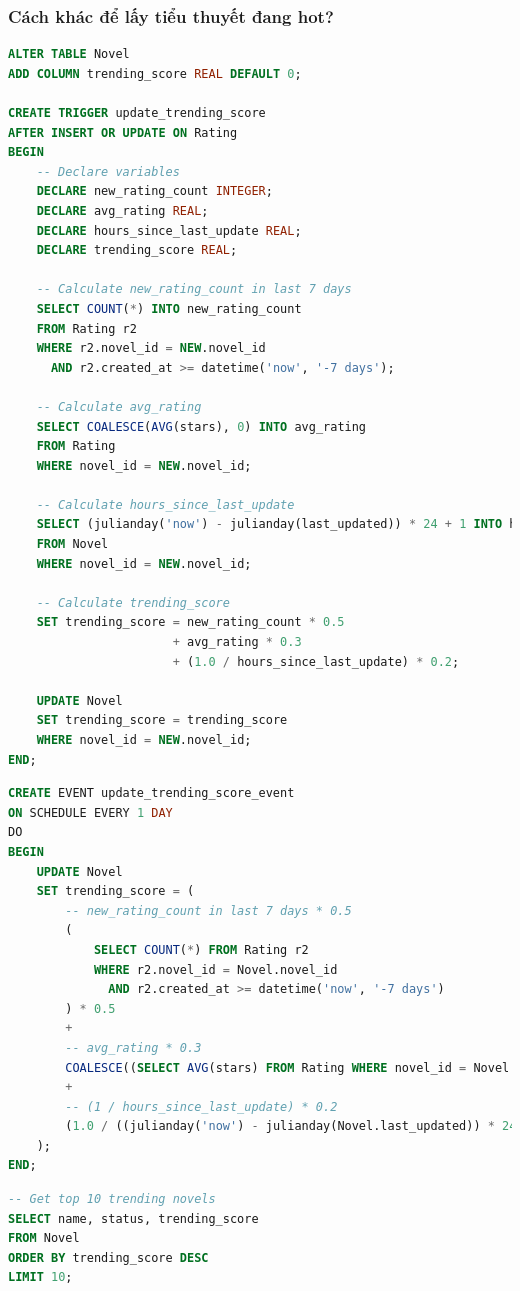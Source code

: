 \documentclass[12pt,aspectratio=169,handout]{beamer}
\begin{document}
\begin{frame}
\frametitle{Cách khác để lấy tiểu thuyết đang hot?}
\begin{lstlisting}[language=SQL, basicstyle=\footnotesize\ttfamily]
ALTER TABLE Novel
ADD COLUMN trending_score REAL DEFAULT 0;

CREATE TRIGGER update_trending_score
AFTER INSERT OR UPDATE ON Rating
BEGIN
    -- Declare variables
    DECLARE new_rating_count INTEGER;
    DECLARE avg_rating REAL;
    DECLARE hours_since_last_update REAL;
    DECLARE trending_score REAL;

    -- Calculate new_rating_count in last 7 days
    SELECT COUNT(*) INTO new_rating_count
    FROM Rating r2
    WHERE r2.novel_id = NEW.novel_id
      AND r2.created_at >= datetime('now', '-7 days');

    -- Calculate avg_rating
    SELECT COALESCE(AVG(stars), 0) INTO avg_rating
    FROM Rating
    WHERE novel_id = NEW.novel_id;

    -- Calculate hours_since_last_update
    SELECT (julianday('now') - julianday(last_updated)) * 24 + 1 INTO hours_since_last_update
    FROM Novel
    WHERE novel_id = NEW.novel_id;

    -- Calculate trending_score
    SET trending_score = new_rating_count * 0.5
                       + avg_rating * 0.3
                       + (1.0 / hours_since_last_update) * 0.2;

    UPDATE Novel
    SET trending_score = trending_score
    WHERE novel_id = NEW.novel_id;
END;
\end{lstlisting}

\framebreak
\begin{lstlisting}[language=SQL, basicstyle=\small\ttfamily]
CREATE EVENT update_trending_score_event
ON SCHEDULE EVERY 1 DAY
DO
BEGIN
    UPDATE Novel
    SET trending_score = (
        -- new_rating_count in last 7 days * 0.5
        (
            SELECT COUNT(*) FROM Rating r2
            WHERE r2.novel_id = Novel.novel_id
              AND r2.created_at >= datetime('now', '-7 days')
        ) * 0.5
        +
        -- avg_rating * 0.3
        COALESCE((SELECT AVG(stars) FROM Rating WHERE novel_id = Novel.novel_id), 0) * 0.3
        +
        -- (1 / hours_since_last_update) * 0.2
        (1.0 / ((julianday('now') - julianday(Novel.last_updated)) * 24 + 1)) * 0.2
    );
END;
\end{lstlisting}

\framebreak
\begin{lstlisting}[language=SQL, basicstyle=\small\ttfamily]
-- Get top 10 trending novels
SELECT name, status, trending_score
FROM Novel
ORDER BY trending_score DESC
LIMIT 10;
\end{lstlisting}
\end{frame}
\end{document}
